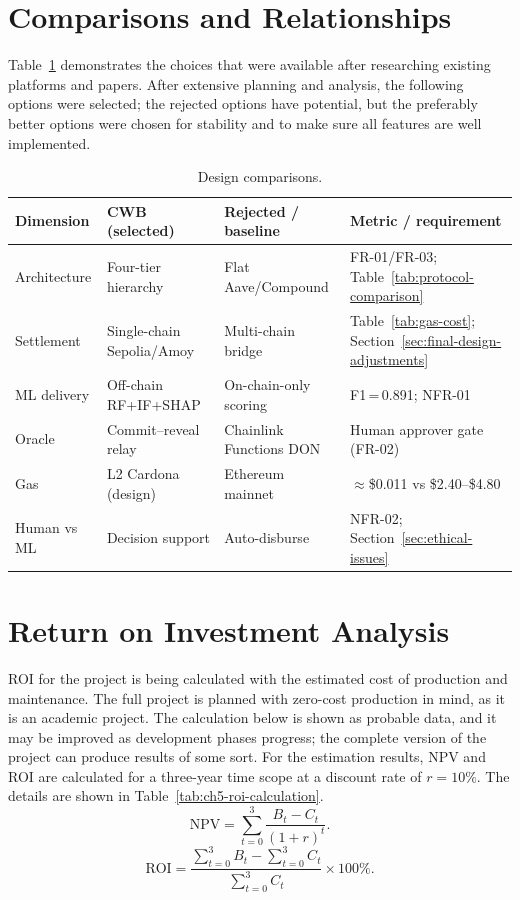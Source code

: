 \documentclass[12pt,a4paper]{report}
\newcommand{\tableheadcolor}{\rowcolor{TableHeadBg}}
\begin{document}
\section{Comparisons and Relationships}
\label{sec:comparisons-relationships}

Table~\ref{tab:comparison-relationships} demonstrates the choices that were available after researching existing platforms and papers. After extensive planning and analysis, the following options were selected; the rejected options have potential, but the preferably better options were chosen for stability and to make sure all features are well implemented.

\begin{table}[H]
\centering
\caption[Design comparisons]{Design comparisons.}
\label{tab:comparison-relationships}
\footnotesize
\begin{tabular}{@{}p{2.4cm}p{2.8cm}p{2.8cm}p{5.2cm}@{}}
\toprule
\tableheadcolor
\textbf{Dimension} & \textbf{CWB (selected)} & \textbf{Rejected / baseline} & \textbf{Metric / requirement} \\
\midrule
Architecture & Four-tier hierarchy & Flat Aave/Compound & FR-01/FR-03; Table~\ref{tab:protocol-comparison} \\
Settlement & Single-chain Sepolia/Amoy & Multi-chain bridge & Table~\ref{tab:gas-cost}; Section~\ref{sec:final-design-adjustments} \\
ML delivery & Off-chain RF+IF+SHAP & On-chain-only scoring & F1\,=\,0.891; NFR-01 \\
Oracle & Commit--reveal relay & Chainlink Functions DON & Human approver gate (FR-02) \\
Gas & L2 Cardona (design) & Ethereum mainnet & ${\approx}$\$0.011 vs \$2.40--\$4.80 \\
Human vs ML & Decision support & Auto-disburse & NFR-02; Section~\ref{sec:ethical-issues} \\
\bottomrule
\end{tabular}
\end{table}

\section{Return on Investment Analysis}
\label{sec:ch5-roi}

ROI for the project is being calculated with the estimated cost of production and maintenance. The full project is planned with zero-cost production in mind, as it is an academic project. The calculation below is shown as probable data, and it may be improved as development phases progress; the complete version of the project can produce results of some sort. For the estimation results, NPV and ROI are calculated for a three-year time scope at a discount rate of $r=10\%$. The details are shown in Table~\ref{tab:ch5-roi-calculation}.
\[
\mathrm{NPV}=\sum_{t=0}^{3}\frac{B_t-C_t}{(1+r)^t}.
\]
\[
\mathrm{ROI}=\frac{\sum_{t=0}^{3}B_t-\sum_{t=0}^{3}C_t}{\sum_{t=0}^{3}C_t}\times 100\%.
\]
\end{document}
